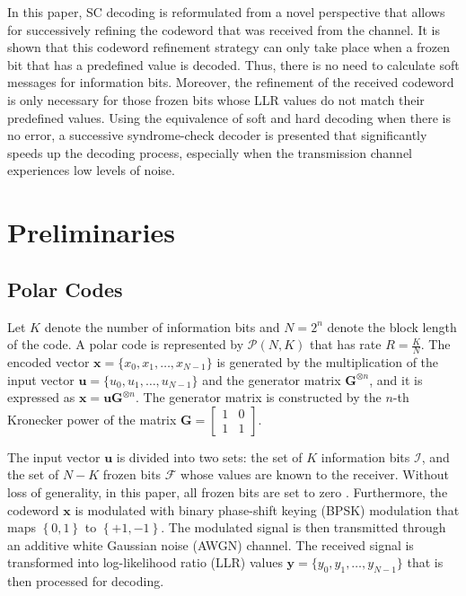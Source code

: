 \documentclass[conference]{IEEEtran}
\begin{document}
In this paper, SC decoding is reformulated from a novel perspective that allows for successively refining the codeword that was received from the channel. It is shown that this codeword refinement strategy can only take place when a frozen bit that has a predefined value is decoded. Thus, there is no need to calculate soft messages for information bits. Moreover, the refinement of the received codeword is only necessary for those frozen bits whose LLR values do not match their predefined values. Using the equivalence of soft and hard decoding when there is no error, a successive syndrome-check decoder is presented that significantly speeds up the decoding process, especially when the transmission channel experiences low levels of noise.

\section{Preliminaries}

\subsection{Polar Codes} \label{sec:PC}

Let $K$ denote the number of information bits and $N=2^n$ denote the block length of the code. A polar code is represented by $\mathcal{P}\left(N,K\right)$ that has rate $R = \frac{K}{N}$. The encoded vector $\bm{x} = \{x_0,x_1,\ldots,x_{N-1}\}$ is generated by the multiplication of the input vector $\bm{u} = \{u_0,u_1,\ldots,u_{N-1}\}$ and the generator matrix $\bm{G}^{\otimes n}$, and it is expressed as $\bm{x}=\bm{u}\bm{G}^{\otimes n}$. The generator matrix is constructed by the $n$-th Kronecker power of the matrix $\bm{G}=\left[\begin{smallmatrix}1&0\\1&1\end{smallmatrix}\right]$.

The input vector $\bm{u}$ is divided into two sets: the set of $K$ information bits $\mathcal{I}$, and the set of $N-K$ frozen bits $\mathcal{F}$ whose values are known to the receiver. Without loss of generality, in this paper, all frozen bits are set to zero \cite{arikan2009}. Furthermore, the codeword $\bm{x}$ is modulated with binary phase-shift keying (BPSK) modulation that maps $\left\{0,1\right\}$ to $\left\{+1,-1\right\}$. The modulated signal is then transmitted through an additive white Gaussian noise (AWGN) channel. The received signal is transformed into log-likelihood ratio (LLR) values $\bm{y} = \{y_0,y_1,\ldots,y_{N-1}\}$ that is then processed for decoding. %
\end{document}
